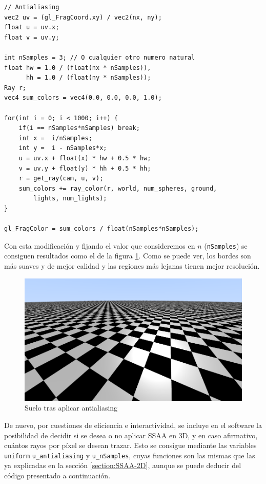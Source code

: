 \begin{lstlisting}
// Antialiasing
vec2 uv = (gl_FragCoord.xy) / vec2(nx, ny);
float u = uv.x;
float v = uv.y;

int nSamples = 3; // O cualquier otro numero natural
float hw = 1.0 / (float(nx * nSamples)),
      hh = 1.0 / (float(ny * nSamples));
Ray r;
vec4 sum_colors = vec4(0.0, 0.0, 0.0, 1.0);

for(int i = 0; i < 1000; i++) {
    if(i == nSamples*nSamples) break;
    int x =  i/nSamples;
    int y =  i - nSamples*x;
    u = uv.x + float(x) * hw + 0.5 * hw;
    v = uv.y + float(y) * hh + 0.5 * hh;
    r = get_ray(cam, u, v);
    sum_colors += ray_color(r, world, num_spheres, ground, 
        lights, num_lights);
}

gl_FragColor = sum_colors / float(nSamples*nSamples);
\end{lstlisting}

Con esta modificación y fijando el valor que consideremos en $n$ (\verb|nSamples|) se consiguen resultados como el de la figura \ref{fig:antialiasing-3D}. Como se puede ver, los bordes son más suaves y de mejor calidad y las regiones más lejanas tienen mejor resolución.

\begin{figure} [ht]
    \centering
    \includegraphics[width=12cm]{img/C8/antialiasing.png}
    \caption{Suelo tras aplicar antialiasing}
    \label{fig:antialiasing-3D}
\end{figure}

De nuevo, por cuestiones de eficiencia e interactividad, se incluye en el software la posibilidad de decidir si se desea o no aplicar SSAA en 3D, y en caso afirmativo, cuántos rayos por píxel se desean trazar. Esto se consigue mediante las variables \verb|uniform| \verb|u_antialiasing| y \verb|u_nSamples|, cuyas funciones son las mismas que las ya explicadas en la sección \ref{section:SSAA-2D}, aunque se puede deducir del código presentado a continuación.

